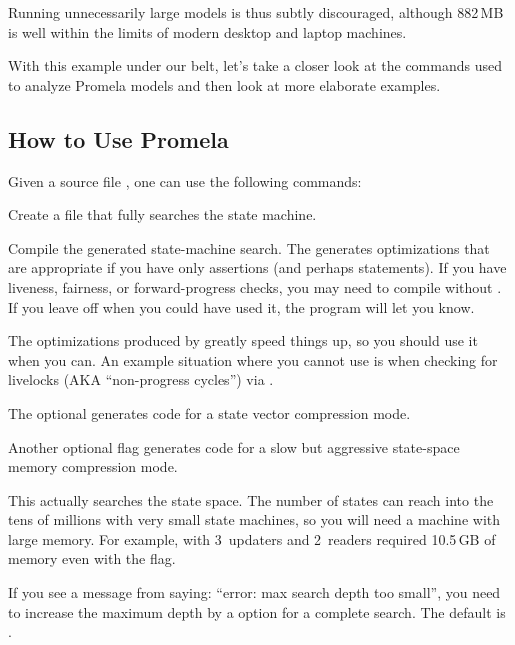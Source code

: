 Running unnecessarily large models is thus subtly discouraged, although
882\,MB is well within the limits of modern desktop and laptop machines.

With this example under our belt, let's take a closer look at the
commands used to analyze Promela models and then look at more
elaborate examples.

\subsection{How to Use Promela}
\label{sec:formal:How to Use Promela}

Given a source file , one can use the following commands:

\begin{description}[style=nextline]
\item	[\tco{spin -a qrcu.spin}]
	Create a file  that fully searches the state machine.
\item	[\tco{cc -DSAFETY [-DCOLLAPSE] [-DMA=N] -o pan pan.c}]
	Compile the generated state-machine search.  The 
	generates optimizations that are appropriate if you have only
	assertions (and perhaps  statements).  If you have
	liveness, fairness, or forward-progress checks, you may need
	to compile without .  If you leave off 
	when you could have used it, the program will let you know.

	The optimizations produced by  greatly speed things
	up, so you should use it when you can.
	An example situation where you cannot use  is
	when checking for livelocks (AKA ``non-progress cycles'')
	via .

	The optional  generates code for a state vector
	compression mode.

	Another optional flag  generates code for a slow
	but aggressive state-space memory compression mode.
\item	[\tco{./pan [-mN] [-wN]}]
	This actually searches the state space.  The number of states
	can reach into the tens of millions with very small state
	machines, so you will need a machine with large memory.
	For example,  with 3~updaters and 2~readers required
	10.5\,GB of memory even with the  flag.

	If you see a message from  saying:
	``error: max search depth too small'', you need to increase
	the maximum depth by a  option for a complete search.
	The default is .


\end{description}

